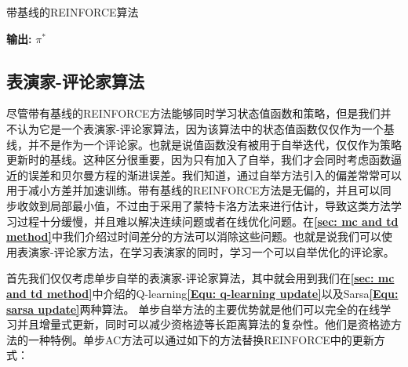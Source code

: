 \begin{algorithm}[h]
	\caption{带基线的REINFORCE算法}
	\label{alg:REINFORCE with baseline}
	\begin{algorithmic}[1]
		\ENDFOR
		\ENDWHILE
	\end{algorithmic}
	\hspace*{0.02in} {\bf 输出:} $\pi^{*}$
\end{algorithm}

\subsection{表演家-评论家算法}
尽管带有基线的REINFORCE方法能够同时学习状态值函数和策略，但是我们并不认为它是一个表演家-评论家算法，因为该算法中的状态值函数仅仅作为一个基线，并不是作为一个评论家。也就是说值函数没有被用于自举迭代，仅仅作为策略更新时的基线。这种区分很重要，因为只有加入了自举，我们才会同时考虑函数逼近的误差和贝尔曼方程的渐进误差。我们知道，通过自举方法引入的偏差常常可以用于减小方差并加速训练。带有基线的REINFORCE方法是无偏的，并且可以同步收敛到局部最小值，不过由于采用了蒙特卡洛方法来进行估计，导致这类方法学习过程十分缓慢，并且难以解决连续问题或者在线优化问题。在\textbf{\ref{sec: mc and td method}}中我们介绍过时间差分的方法可以消除这些问题。也就是说我们可以使用表演家-评论家方法，在学习表演家的同时，学习一个可以自举优化的评论家。

首先我们仅仅考虑单步自举的表演家-评论家算法，其中就会用到我们在\textbf{\ref{sec: mc and td method}}中介绍的Q-learning\textbf{\eqref{Equ: q-learning update}}以及Sarsa\textbf{\eqref{Equ: sarsa update}}两种算法。 单步自举方法的主要优势就是他们可以完全的在线学习并且增量式更新，同时可以减少资格迹等长距离算法的复杂性。他们是资格迹方法的一种特例。单步AC方法可以通过如下的方法替换REINFORCE中的更新方式：

